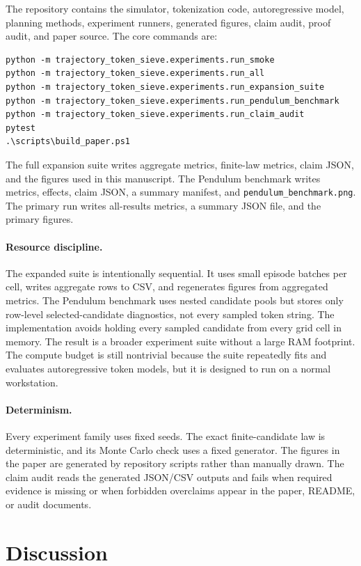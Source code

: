 \documentclass{article}
\begin{document}
The repository contains the simulator, tokenization code, autoregressive model, planning methods, experiment runners, generated figures, claim audit, proof audit, and paper source. The core commands are:
{\footnotesize
\begin{verbatim}
python -m trajectory_token_sieve.experiments.run_smoke
python -m trajectory_token_sieve.experiments.run_all
python -m trajectory_token_sieve.experiments.run_expansion_suite
python -m trajectory_token_sieve.experiments.run_pendulum_benchmark
python -m trajectory_token_sieve.experiments.run_claim_audit
pytest
.\scripts\build_paper.ps1
\end{verbatim}
}
The full expansion suite writes aggregate metrics, finite-law metrics, claim JSON, and the figures used in this manuscript. The Pendulum benchmark writes metrics, effects, claim JSON, a summary manifest, and \texttt{pendulum\_benchmark.png}. The primary run writes all-results metrics, a summary JSON file, and the primary figures.

\paragraph{Resource discipline.}
The expanded suite is intentionally sequential. It uses small episode batches per cell, writes aggregate rows to CSV, and regenerates figures from aggregated metrics. The Pendulum benchmark uses nested candidate pools but stores only row-level selected-candidate diagnostics, not every sampled token string. The implementation avoids holding every sampled candidate from every grid cell in memory. The result is a broader experiment suite without a large RAM footprint. The compute budget is still nontrivial because the suite repeatedly fits and evaluates autoregressive token models, but it is designed to run on a normal workstation.

\paragraph{Determinism.}
Every experiment family uses fixed seeds. The exact finite-candidate law is deterministic, and its Monte Carlo check uses a fixed generator. The figures in the paper are generated by repository scripts rather than manually drawn. The claim audit reads the generated JSON/CSV outputs and fails when required evidence is missing or when forbidden overclaims appear in the paper, README, or audit documents.

\section{Discussion}
\end{document}
